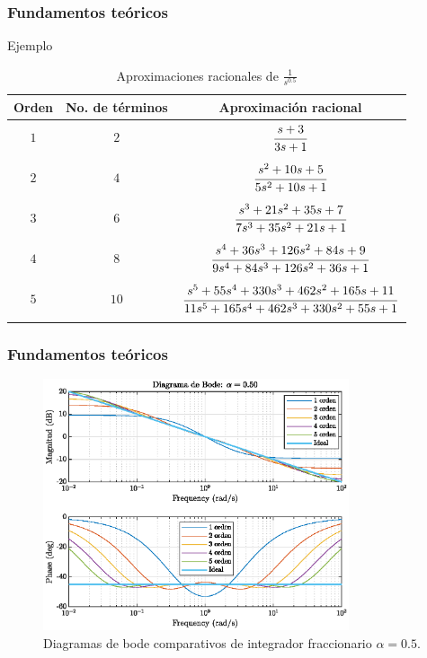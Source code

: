 \documentclass[10pt]{beamer}
\begin{document}
	\begin{frame}
		\frametitle{Fundamentos teóricos}
		\begin{block}{Ejemplo}
			\begin{scriptsize}
			\begin{table}[!hbp]
		\caption{Aproximaciones racionales de $\frac{1}{s^{0.5}}$}
		\label{tab:aprox_cfe_alpha_0.5}
		\centering
		\begin{tabular}{c c c}
			\hline
			\textbf{Orden} &  \textbf{No. de términos} & \textbf{Aproximación racional}\\
			\hline
			$1$ 		& $2$ 		&  $\cfrac{s + 3}{3s + 1}$\\
					 		& 		 		& \\
			$2$			& $4$ 		&  $\cfrac{s^{2} + 10s + 5}{5 s^{2} + 10s + 1}$\\
							& 		 		& \\
			$3$ 		& $6$ 		&  $\cfrac{s^{3} + 21s^{2} + 35s + 7}{7 s^3 + 35 s^2 + 21 s + 1}$	\\
							& 		 		& \\
			$4$ 		& $8$ 		&  $\cfrac{s^4 + 36 s^3 + 126 s^2 + 84 s + 9}{9 s^4 + 84 s^3 + 126 s^2 + 36 s + 1}$\\
							& 		 		& \\
			$5$ 		& $10$ 		&  $\cfrac{s^5 + 55 s^4 + 330 s^3 + 462 s^2 + 165 s + 11}{11 s^5 + 165 s^4 + 462 s^3 + 330 s^2 + 55 s + 1}$\\
							& 		 		& \\
			\hline
		\end{tabular}
	\end{table}
			\end{scriptsize}
		\end{block}
	\end{frame}	
	\begin{frame}
		\frametitle{Fundamentos teóricos}
		\begin{figure}[hbtp]
			\caption{Diagramas de bode comparativos de integrador fraccionario $\alpha = 0.5$.} 
			\label{fig:F1_bode_integrador_alpha05}
			\centering
			\includegraphics[width=9cm]{../imagenes/F1_bode_integrador_alpha05.eps}
		\end{figure}	
	\end{frame}
\end{document}
